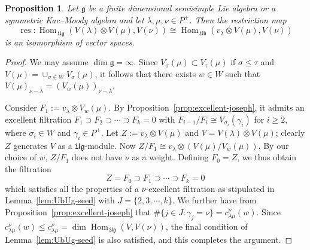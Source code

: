 \documentclass[12pt,reqno]{amsart}
\theoremstyle{plain}
\newtheorem{proposition}[theorem]{Proposition}
\theoremstyle{definition}
\theoremstyle{remark}
\theoremstyle{plain}
\newcommand{\lie}{\mathfrak}
\newcommand{\lrw}{c_{\lambda\mu}^\nu(w)}
\newcommand{\lr}{c_{\lambda\mu}^\nu}
\DeclareMathOperator{\res}{res}
\DeclareMathOperator{\Hom}{Hom}
\begin{document}
\begin{proposition}\label{prop:invlim}
    Let $\mathfrak{g}$ be a finite dimensional semisimple Lie algebra or a symmetric Kac--Moody algebra and let $\lambda, \mu, \nu \in P^+$. Then the restriction map $$\res: \Hom_{\,\mathfrak{Ug}}(V(\lambda)\otimes V(\mu), V(\nu))\cong  \Hom_{\,\mathfrak{Ub}}(v_\lambda\otimes V(\mu), V(\nu))$$ is an isomorphism of vector spaces.
\end{proposition}
\begin{proof}
    We may assume $\dim \lie g = \infty$. Since $V_\sigma(\mu) \subset V_\tau(\mu)$ if $\sigma \leq \tau$ and $V(\mu)= \cup_{\sigma \in W} V_\sigma(\mu)$, it follows that there exists $w \in W$ such that $V(\mu)_{\nu-\lambda} = (V_w(\mu))_{\nu-\lambda}$. 

    Consider $F_1 := v_\lambda \otimes V_w(\mu)$. By Proposition~\ref{prop:excellent-joseph},  it admits an excellent filtration $F_1 \supset F_2 \supset \cdots \supset F_k=0$ with $F_{i-1}/F_i \cong V_{\sigma_i}(\gamma_i)$ for $i \geq 2$, where $\sigma_i \in W$ and $\gamma_i \in P^+$. Let $Z :=v_\lambda \otimes V(\mu)$ and $V = V(\lambda) \otimes V(\mu)$; clearly $Z$ generates $V$ as a $\lie{Ug}$-module. Now $Z/F_1 \cong v_\lambda \otimes (V(\mu)/V_w(\mu))$. By our choice of $w$, $Z/F_1$ does not have $\nu$ as a weight. Defining $F_0 = Z$, we thus obtain the filtration
    \[ Z = F_0 \supset F_1 \supset \cdots \supset F_k=0\]
which satisfies all the properties of a $\nu$-excellent filtration as stipulated in Lemma~\ref{lem:UbUg-seed} with $J=\{2, 3, \cdots, k\}$. We further have from Proposition~\ref{prop:excellent-joseph} that $\#\{j \in J: \gamma_j = \nu\} = \lrw$. Since $\lrw \leq \lr = \dim \Hom_{\,\mathfrak{Ug}} (V, V(\nu))$, the final condition of Lemma~\ref{lem:UbUg-seed} is also satisfied, and this completes the argument.
\end{proof}
\end{document}
